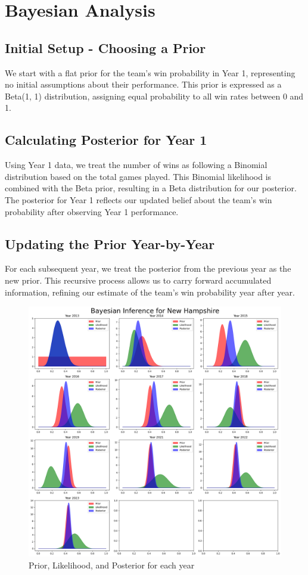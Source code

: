 \section{Bayesian Analysis}

\subsection{Initial Setup - Choosing a Prior}

We start with a flat prior for the team’s win probability in Year 1, representing no initial assumptions about their performance.
This prior is expressed as a Beta(1, 1) distribution, assigning equal probability to all win rates between 0 and 1.

\subsection{Calculating Posterior for Year 1}

Using Year 1 data, we treat the number of wins as following a Binomial distribution based on the total games played.
This Binomial likelihood is combined with the Beta prior, resulting in a Beta distribution for our posterior.
The posterior for Year 1 reflects our updated belief about the team’s win probability after observing Year 1 performance.

\subsection{Updating the Prior Year-by-Year}

For each subsequent year, we treat the posterior from the previous year as the new prior.
This recursive process allows us to carry forward accumulated information, refining our estimate of the team’s win probability year after year.

\begin{figure}[!ht]
  \centering
  \includegraphics[width=.6\textwidth]{images/posterior-subplots.png}
  \caption{Prior, Likelihood, and Posterior for each year}
\end{figure}


